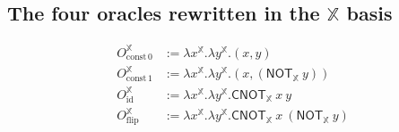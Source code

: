 \documentclass[a4paper,UKenglish,numberwithinsect,pdfa,anonymous]{lipics-v2021}
\theoremstyle{restatestyle}
\def\Pair#1#2{(#1,#2)} %
\def\Lam#1#2#3{\lambda#1^{#2}{.}#3} %
\newcommand\XB{\mathbb X}
\newcommand{\cnotXB}[2]{\mathsf{CNOT}_{\XB}\ #1\ #2}
\newcommand{\pauliXXB}[1]{\mathsf{NOT}_{\XB}\ #1}
\begin{document}
\subsection{The four oracles rewritten in the \texorpdfstring{$\XB$}{X} basis}
\begin{align*}
  O_{\mathrm{const}\,0}^{\XB} &:= \Lam{x}{\XB}{\Lam{y}{\XB}{\Pair{x}{y}}}\\
  O_{\mathrm{const}\,1}^{\XB} &:= \Lam{x}{\XB}{\Lam{y}{\XB}{\Pair{x}{(\pauliXXB{y})}}}\\
  O_{\mathrm{id}}^{\XB} &:= \Lam{x}{\XB}{\Lam{y}{\XB}{\cnotXB{x}{y}}}\\
  O_{\mathrm{flip}}^{\XB} &:= \Lam{x}{\XB}{\Lam{y}{\XB}{\cnotXB{x}{(\pauliXXB{y})}}}
\end{align*}
\end{document}
